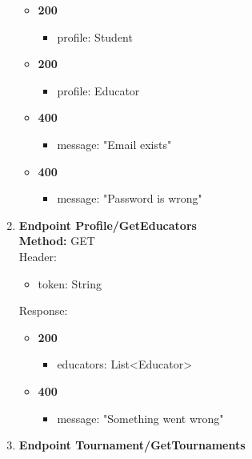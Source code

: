 \begin{enumerate}
\begin{itemize}
        \item \textbf{200} \\
        \begin{itemize}
            \item profile: Student
        \end{itemize}
        \item \textbf{200} \\
        \begin{itemize}
            \item profile: Educator
        \end{itemize}
        \item \textbf{400} \\
        \begin{itemize}
            \item message: "Email exists"
        \end{itemize}
        \item \textbf{400} \\
        \begin{itemize}
            \item message: "Password is wrong"
        \end{itemize}
    \end{itemize}
    \item \textbf{Endpoint Profile/GetEducators} \\
    \textbf{Method:} GET \\
    Header:\\
    \begin{itemize}
        \item token: String
    \end{itemize}
    Response:\\
    \begin{itemize}
        \item \textbf{200} \\
        \begin{itemize}
            \item educators: List<Educator>
        \end{itemize}
        \item \textbf{400} \\
        \begin{itemize}
            \item message: "Something went wrong"
        \end{itemize}
    \end{itemize}
    \item \textbf{Endpoint Tournament/GetTournaments} \\

\end{enumerate}
